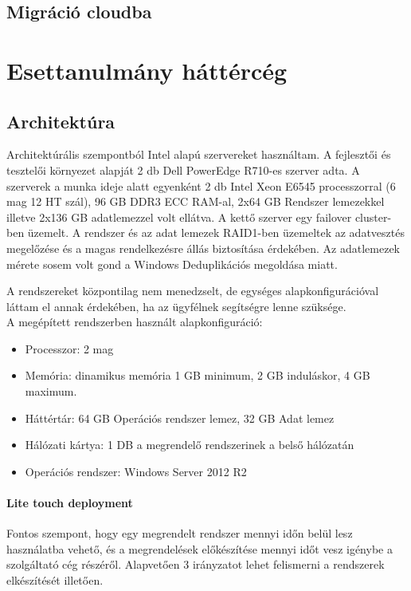 \documentclass[12pt,oneside,justify,table]{book}
\begin{document}
\section{Migráció cloudba}



\chapter{Esettanulmány háttércég}

\section{Architektúra}

Architektúrális szempontból Intel alapú szervereket használtam. A fejlesztői és tesztelői környezet alapját 2 db Dell PowerEdge R710-es szerver adta. A szerverek a munka ideje alatt egyenként 2 db Intel Xeon E6545 processzorral (6 mag 12 HT szál), 96 GB DDR3 ECC RAM-al, 2x64 GB Rendszer lemezekkel illetve 2x136 GB adatlemezzel volt ellátva. A kettő szerver egy failover cluster-ben üzemelt. A rendszer és az adat lemezek RAID1-ben üzemeltek az adatvesztés megelőzése és a magas rendelkezésre állás biztosítása érdekében. Az adatlemezek mérete sosem volt gond a Windows Deduplikációs megoldása miatt.

A rendszereket központilag nem menedzselt, de egységes alapkonfigurációval láttam el annak érdekében, ha az ügyfélnek segítségre lenne szüksége. \\

\noindent A megépített rendszerben használt alapkonfiguráció:
\begin{itemize}
	\item Processzor: 2 mag
	\item Memória: dinamikus memória 1 GB minimum, 2 GB induláskor, 4 GB maximum.
	\item Háttértár: 64 GB Operációs rendszer lemez, 32 GB Adat lemez
	\item Hálózati kártya: 1 DB a megrendelő rendszerinek a belső hálózatán
	\item Operációs rendszer: Windows Server 2012 R2
\end{itemize}

\subsubsection{Lite touch deployment}
Fontos szempont, hogy egy megrendelt rendszer mennyi időn belül lesz használatba vehető, és a megrendelések előkészítése mennyi időt vesz igénybe a szolgáltató cég részéről. Alapvetően 3 irányzatot lehet felismerni a rendszerek elkészítését illetően.\\
\end{document}
